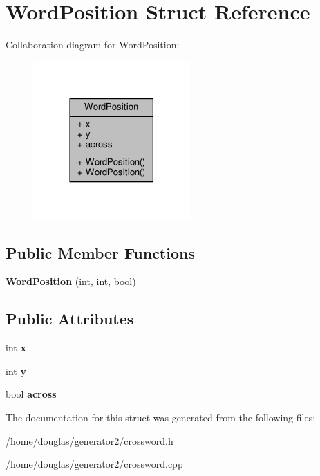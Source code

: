 \hypertarget{structWordPosition}{}\section{Word\+Position Struct Reference}
\label{structWordPosition}


Collaboration diagram for Word\+Position\+:
\nopagebreak
\begin{figure}[H]
\begin{center}
\leavevmode
\includegraphics[width=170pt]{structWordPosition__coll__graph}
\end{center}
\end{figure}
\subsection*{Public Member Functions}
\begin{DoxyCompactItemize}
\item 
{\bfseries Word\+Position} (int, int, bool)\hypertarget{structWordPosition_a38c95017c377ad16651c97b10b0dcede}{}\label{structWordPosition_a38c95017c377ad16651c97b10b0dcede}

\end{DoxyCompactItemize}
\subsection*{Public Attributes}
\begin{DoxyCompactItemize}
\item 
int {\bfseries x}\hypertarget{structWordPosition_a2890fdea644169f37ba1e7c912457067}{}\label{structWordPosition_a2890fdea644169f37ba1e7c912457067}

\item 
int {\bfseries y}\hypertarget{structWordPosition_ab9bc9609c0fb99a32e28b11682058afe}{}\label{structWordPosition_ab9bc9609c0fb99a32e28b11682058afe}

\item 
bool {\bfseries across}\hypertarget{structWordPosition_a05977e4582ba1572a64c59ac9394bcb4}{}\label{structWordPosition_a05977e4582ba1572a64c59ac9394bcb4}

\end{DoxyCompactItemize}


The documentation for this struct was generated from the following files\+:\begin{DoxyCompactItemize}
\item 
/home/douglas/generator2/crossword.\+h\item 
/home/douglas/generator2/crossword.\+cpp\end{DoxyCompactItemize}
